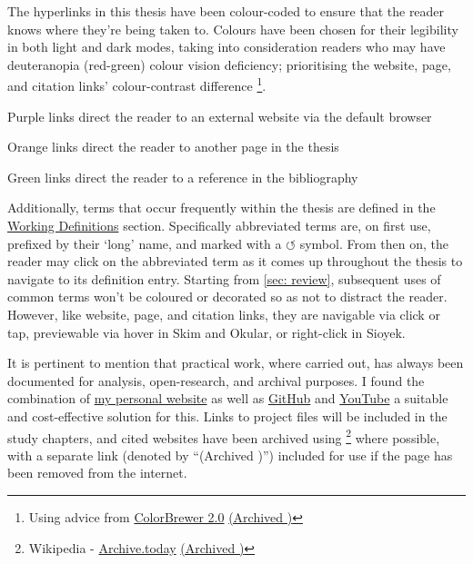 \begin{SingleSpace}
\noindent The hyperlinks in this thesis have been colour-coded to ensure that the reader knows where they're being taken to. Colours have been chosen for their legibility in both light and dark modes, taking into consideration readers who may have deuteranopia (red-green) colour vision deficiency; prioritising the \textcolor{Hyurlcolor}{website}, \textcolor{Hylinkcolor}{page}, and \textcolor{Hycitecolor}{citation} links' colour-contrast difference \footnote{Using advice from \href{https://colorbrewer2.org/\#type=qualitative\&scheme=Dark2}{ColorBrewer 2.0} \href{https://archive.today/oRW5e}{(Archived \faArchive)}}.

\vspace*{0.25cm}
\noindent\textcolor{Hyurlcolor}{Purple} links direct the reader to an external website via the default browser

\noindent\textcolor{Hylinkcolor}{Orange} links direct the reader to another page in the thesis

\noindent\textcolor{Hycitecolor}{Green} links direct the reader to a reference in the bibliography

\vspace*{0.25cm}
\noindent Additionally, terms that occur frequently within the thesis are defined in the \hyperref[main]{Working Definitions} section. Specifically abbreviated terms are, on first use, prefixed by their `long' name, and marked with a \textcolor{Hylinkcolor}{$\circlearrowleft$} symbol. From then on, the reader may click on the abbreviated term as it comes up throughout the thesis to navigate to its definition entry. Starting from \autoref{sec: review}, subsequent uses of common terms won't be coloured or decorated so as not to distract the reader. However, like \textcolor{Hyurlcolor}{website}, \textcolor{Hylinkcolor}{page}, and \textcolor{Hycitecolor}{citation} links, they are navigable via click or tap, previewable via hover in Skim and Okular, or right-click in Sioyek.

It is pertinent to mention that practical work, where carried out, has always been documented for analysis, open-research, and archival purposes. I found the combination of \href{https://sambilbow.github.io}{my personal website} as well as \href{https://github.com/sambilbow}{GitHub} and \href{https://youtube.com/@sambilbow}{YouTube} a suitable and cost-effective solution for this. Links to project files will be included in the study chapters, and cited websites have been archived using  \footnote{Wikipedia - \href{https://en.wikipedia.org/wiki/Archive.today}{Archive.today} \href{https://archive.today/dWUvw}{(Archived \faArchive)}} where possible, with a separate link (denoted by ``(Archived \faArchive)'') included for use if the page has been removed from the internet. 


\end{SingleSpace}
